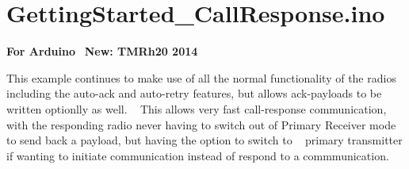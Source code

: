 \hypertarget{GettingStarted_CallResponse_8ino-example}{}\section{Getting\+Started\+\_\+\+Call\+Response.\+ino}
{\bfseries For Arduino}~\newline
 {\bfseries New\+: T\+M\+Rh20 2014}~\newline


This example continues to make use of all the normal functionality of the radios including the auto-\/ack and auto-\/retry features, but allows ack-\/payloads to be written optionlly as well. ~\newline
 This allows very fast call-\/response communication, with the responding radio never having to switch out of Primary Receiver mode to send back a payload, but having the option to switch to ~\newline
 primary transmitter if wanting to initiate communication instead of respond to a commmunication.


